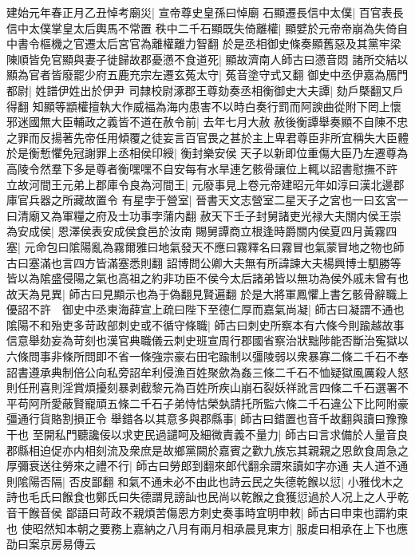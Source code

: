 建始元年春正月乙丑悼考廟災|{
	宣帝尊史皇孫曰悼廟}
石顯遷長信中太僕|{
	百官表長信中太僕掌皇太后輿馬不常置}
秩中二千石顯既失倚離權|{
	顯嬖於元帝帝崩為失倚自中書令樞機之官遷太后宮官為離權離力智翻}
於是丞相御史條奏顯舊惡及其黨牢梁陳順皆免官顯與妻子徙歸故郡憂懣不食道死|{
	顯故濟南人師古曰懣音悶}
諸所交結以顯為官者皆廢罷少府五鹿充宗左遷玄菟太守|{
	菟音塗守式又翻}
御史中丞伊嘉為鴈門都尉|{
	姓譜伊姓出於伊尹}
司隸校尉涿郡王尊劾奏丞相衡御史大夫譚|{
	劾戶槩翻又戶得翻}
知顯等顓權擅執大作威福為海内患害不以時白奏行罰而阿諛曲從附下罔上懷邪迷國無大臣輔政之義皆不道在赦令前|{
	去年七月大赦}
赦後衡譚舉奏顯不自陳不忠之罪而反揚著先帝任用傾覆之徒妄言百官畏之甚於主上卑君尊臣非所宜稱失大臣體於是衡慙懼免冠謝罪上丞相侯印綬|{
	衡封樂安侯}
天子以新即位重傷大臣乃左遷尊為高陵令然羣下多是尊者衡嘿嘿不自安每有水旱連乞骸骨讓位上輒以詔書慰撫不許　立故河間王元弟上郡庫令良為河間王|{
	元廢事見上卷元帝建昭元年如淳曰漢北邊郡庫官兵器之所藏故置令}
有星孛于營室|{
	晉書天文志營室二星天子之宮也一曰玄宮一曰清廟又為軍糧之府及士功事孛蒲内翻}
赦天下壬子封舅諸吏光禄大夫關内侯王崇為安成侯|{
	恩澤侯表安成侯食邑於汝南}
賜舅譚商立根逢時爵關内侯夏四月黃霧四塞|{
	元命包曰隂陽亂為霧爾雅曰地氣發天不應曰霧釋名曰霧冒也氣蒙冒地之物也師古曰塞滿也言四方皆滿塞悉則翻}
詔博問公卿大夫無有所諱諫大夫楊興博士駟勝等皆以為隂盛侵陽之氣也高祖之約非功臣不侯今太后諸弟皆以無功為侯外戚未曾有也故天為見異|{
	師古曰見顯示也為于偽翻見賢遍翻}
於是大將軍鳳懼上書乞骸骨辭職上優詔不許　御史中丞東海薛宣上疏曰陛下至德仁厚而嘉氣尚凝|{
	師古曰凝謂不通也}
隂陽不和殆吏多苛政部刺史或不循守條職|{
	師古曰刺史所察本有六條今則踰越故事信意舉劾妄為苛刻也漢官典職儀云刺史班宣周行郡國省察治狀黜陟能否斷治寃獄以六條問事非條所問即不省一條強宗豪右田宅踰制以彊陵弱以衆暴寡二條二千石不奉詔書遵承典制倍公向私旁詔牟利侵漁百姓聚歛為姦三條二千石不恤疑獄風厲殺人怒則任刑喜則淫賞煩擾刻暴剥截黎元為百姓所疾山崩石裂妖祥訛言四條二千石選署不平苟阿所愛蔽賢寵頑五條二千石子弟恃怙榮埶請托所監六條二千石違公下比阿附豪彊通行貨賂割損正令}
舉錯各以其意多與郡縣事|{
	師古曰錯置也音千故翻與讀曰豫豫干也}
至開私門聽讒佞以求吏民過譴呵及細微責義不量力|{
	師古曰言求備於人量音良}
郡縣相迫促亦内相刻流及衆庶是故鄉黨闕於嘉賓之歡九族忘其親親之恩飲食周急之厚彌衰送往勞來之禮不行|{
	師古曰勞郎到翻來郎代翻余謂來讀如字亦通}
夫人道不通則隂陽否隔|{
	否皮鄙翻}
和氣不通未必不由此也詩云民之失德乾餱以愆|{
	小雅伐木之詩也毛氏曰餱食也鄭氏曰失德謂見謗訕也民尚以乾餱之食獲愆過於人况上之人乎乾音干餱音侯}
鄙語曰苛政不親煩苦傷恩方刺史奏事時宜明申敕|{
	師古曰申束也謂約束也}
使昭然知本朝之要務上嘉納之八月有兩月相承晨見東方|{
	服䖍曰相承在上下也應劭曰案京房易傳云}


